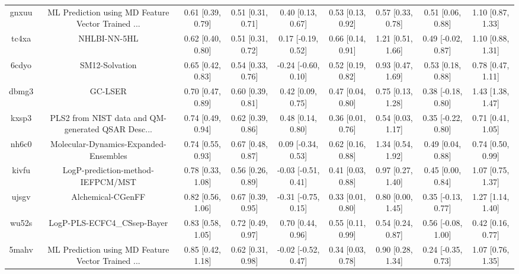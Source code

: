 \documentclass{article}
\begin{document}
\begin{center}
\begin{longtable}{|ccccccccc|}
 gnxuu &  ML Prediction using MD Feature Vector Trained ... &  0.61 [0.39, 0.79] &  0.51 [0.31, 0.71] &     0.40 [0.13, 0.67] &  0.53 [0.13, 0.92] &    0.57 [0.33, 0.78] &    0.51 [0.06, 0.88] &     1.10 [0.87, 1.33] \\
 tc4xa &                                       NHLBI-NN-5HL &  0.62 [0.40, 0.80] &  0.51 [0.31, 0.72] &    0.17 [-0.19, 0.52] &  0.66 [0.14, 0.91] &    1.21 [0.51, 1.66] &   0.49 [-0.02, 0.87] &     1.10 [0.88, 1.31] \\
 6cdyo &                                     SM12-Solvation &  0.65 [0.42, 0.83] &  0.54 [0.33, 0.76] &   -0.24 [-0.60, 0.10] &  0.52 [0.19, 0.82] &    0.93 [0.47, 1.69] &    0.53 [0.18, 0.88] &     0.78 [0.47, 1.11] \\
 dbmg3 &                                            GC-LSER &  0.70 [0.47, 0.89] &  0.60 [0.39, 0.81] &     0.42 [0.09, 0.75] &  0.47 [0.04, 0.80] &    0.75 [0.13, 1.28] &   0.38 [-0.18, 0.80] &     1.43 [1.38, 1.47] \\
 kxsp3 &  PLS2 from NIST data and QM-generated QSAR Desc... &  0.74 [0.49, 0.94] &  0.62 [0.39, 0.86] &     0.48 [0.14, 0.80] &  0.36 [0.01, 0.76] &    0.54 [0.03, 1.17] &   0.35 [-0.22, 0.80] &     0.71 [0.41, 1.05] \\
 nh6c0 &              Molecular-Dynamics-Expanded-Ensembles &  0.74 [0.55, 0.93] &  0.67 [0.48, 0.87] &    0.09 [-0.34, 0.53] &  0.62 [0.16, 0.88] &    1.34 [0.54, 1.92] &    0.49 [0.04, 0.88] &     0.74 [0.50, 0.99] \\
 kivfu &                  LogP-prediction-method-IEFPCM/MST &  0.78 [0.33, 1.08] &  0.56 [0.26, 0.89] &   -0.03 [-0.51, 0.41] &  0.41 [0.03, 0.88] &    0.97 [0.27, 1.40] &    0.45 [0.00, 0.84] &     1.07 [0.75, 1.37] \\
 ujsgv &                                  Alchemical-CGenFF &  0.82 [0.56, 1.06] &  0.67 [0.39, 0.95] &   -0.31 [-0.75, 0.15] &  0.33 [0.01, 0.80] &    0.80 [0.00, 1.45] &   0.35 [-0.13, 0.77] &     1.27 [1.14, 1.40] \\
 wu52s &                        LogP-PLS-ECFC4\_CSsep-Bayer &  0.83 [0.58, 1.05] &  0.72 [0.49, 0.97] &     0.70 [0.44, 0.96] &  0.55 [0.11, 0.99] &    0.54 [0.24, 0.87] &   0.56 [-0.08, 1.00] &     0.42 [0.16, 0.77] \\
 5mahv &  ML Prediction using MD Feature Vector Trained ... &  0.85 [0.42, 1.18] &  0.62 [0.31, 0.98] &   -0.02 [-0.52, 0.47] &  0.34 [0.03, 0.78] &    0.90 [0.28, 1.34] &   0.24 [-0.35, 0.73] &     1.07 [0.76, 1.35] \\

\end{longtable}
\end{center}
\end{document}
